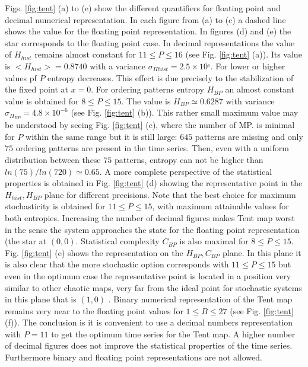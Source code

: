 \begin{enumerate}
Figs. \ref{fig:tent} (a) to (e) show the different quantifiers for floating point and decimal numerical representation. In each figure from (a) to (c) a dashed line shows the value for the floating point representation. In figures (d) and (e) the star corresponds to the floating point case. In decimal representations the value of $H_{hist}$ remains almost constant for $11\leq P\leq 16$ (see Fig. \ref{fig:tent} (a)). Its value is $<H_{hist}>=0.8740$ with a variance $\sigma_{Hhist}=2.5 \times 10^{_6}$. For lower or higher values pf $P$ entropy decreases. This effect is due precisely to the stabilization of the fixed point at $x=0$. For ordering patterns entropy $H_{BP}$ an almost constant value is obtained for $8\leq P \leq 15$. The value is  $H_{BP}\simeq 0.6287$ with variance $\sigma_{H_{BP}}=4.8 \times 10^{-6}$ (see Fig. \ref{fig:tent} (b)). This rather small maximum value may be understood by seeing  Fig. \ref{fig:tent} (c), where the number of MP.
% 
is minimal for $P$ within the same range but it is still large: $645$ patterns are missing and only $75$ ordering patterns are present in the time series. Then, even with a uniform distribution between these $75$ patterns, entropy can not be higher than $ln(75)/ln(720)\simeq 0.65$. 
A more complete perspective of the statistical properties is obtained in Fig. \ref{fig:tent} (d) showing the representative point in the $H_{hist},H_{BP}$ plane for different precisions. Note that the best choice for maximum stochasticity is obtained for $11\leq P \leq 15$, with maximum attainable values for both entropies.
Increasing the number of decimal figures makes Tent map worst in the sense the system approaches the state for the floating point representation (the star at $(0,0)$. 
Statistical complexity $C_{BP}$ is also maximal for $8\leq P \leq 15$. 
Fig. \ref{fig:tent} (e) shows the representation on the $H_{BP},C_{BP}$ plane. In this plane it is also clear that the more stochastic option corresponds with  $11\leq P \leq 15$ but even in the optimum case the representative point is located in a position very similar to other chaotic maps, very far from the ideal point for stochastic systems in this plane that is $(1,0)$ \cite{Rosso2007C}.
Binary numerical representation of the Tent map remains very near to the floating point values for  $1 \leq B \leq 27 $ (see Fig. \ref{fig:tent} (f)).
The conclusion is it is convenient to use a decimal numbers representation with  $P=11$ to get the optimum time series for the Tent map. A higher number of decimal figures does not improve the statistical properties of the time series. Furthermore binary and floating point representations are not allowed. 

\end{enumerate}
